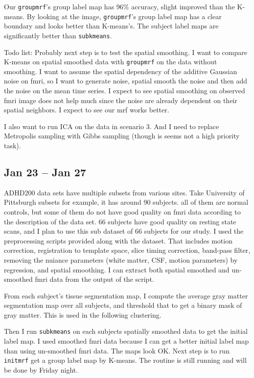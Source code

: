 \documentclass{article}
\begin{document}
Our \texttt{groupmrf}'s group label map has 96\% accuracy, slight improved than the K-means. By looking at the image, \texttt{groupmrf}'s group label map has a clear boundary and looks better than K-means's. The subject label maps are significantly better than \texttt{subkmeans}.

Todo list: Probably next step is to test the spatial smoothing. I want to compare K-means on spatial smoothed data with \texttt{groupmrf} on the data without smoothing. I want to assume the spatial dependency of the additive Gaussian noise on fmri, so I want to generate noise, spatial smooth the noise and then add the noise on the mean time series. I expect to see spatial smoothing on observed fmri image does not help much since the noise are already dependent on their spatial neighbors. I expect to see our mrf works better. 

I also want to run ICA on the data in scenario 3. And I need to replace Metropolis sampling with Gibbs sampling (though is seems not a high priority task).

\subsection{Jan 23 -- Jan 27}
ADHD200 data sets have multiple subsets from various sites. Take University of Pittsburgh subsets for example, it has around 90 subjects. all of them are normal controls, but some of them do not have good quality on fmri data according to the description of the data set. 66 subjects have good quality on resting state scans, and I plan to use this sub dataset of 66 subjects for our study. I used the preprocessing scripts provided along with the dataset. That includes motion correction, registration to template space, slice timing correction, band-pass filter, removing the nuiance parameters (white matter, CSF, motion parameters) by regression, and spatial smoothing. I can extract both spatial smoothed and un-smoothed fmri data from the output of the script.

From each subject's tissue segmentation map, I compute the average gray matter segmentation map over all subjects, and threshold that to get a binary mask of gray matter. This is used in the following clustering.

Then I run \texttt{subkmeans} on each subjects spatially smoothed data to get the initial label map. I used smoothed fmri data because I can get a better initial label map than using un-smoothed fmri data. The maps look OK. Next step is to run \texttt{initmrf} get a group label map by K-means. The routine is still running and will be done by Friday night.
\end{document}
